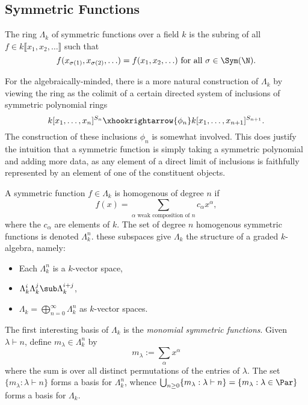 \documentclass[12pt]{article}
\begin{document}
\subsection{Symmetric Functions}

\begin{definition}\label{def:symfunc}
    The ring $ \Lambda_{k} $ of symmetric functions over a field $ k $ is the subring of all $ f\in k\llbracket x_{1}, x_{2}, \ldots\rrbracket $ such that
    \[
      f(x_{\sigma(1)}, x_{\sigma(2)},\ldots) = f(x_{1},x_{2},\ldots) \text{ for all } \sigma\in \Sym(\N).
    \]
\end{definition}
\begin{remark}
    For the algebraically-minded, there is a more natural construction of $ \Lambda_{k} $ by viewing the ring as the colimit of a certain directed system of inclusions of symmetric polynomial rings
    \[
      k[x_{1},\ldots,x_{n}]^{S_{n}} \xhookrightarrow{\phi_{n}} k[x_{1},\ldots,x_{n+1}]^{S_{n+1}}.
    \]
    The construction of these inclusions $ \phi_{n} $ is somewhat involved. This does justify the intuition that a symmetric function is simply taking a symmetric polynomial and adding more data, as any element of a direct limit of inclusions is faithfully represented by an element of one of the constituent objects.

\end{remark}
\begin{definition}
    A symmetric function $ f\in \Lambda_{k} $ is homogenous of degree $ n $ if 
    \[
      f(x) = \sum_{\alpha\text{ weak composition of }n}c_{\alpha} x^{\alpha},
    \]
    where the $ c_{\alpha} $ are elements of $ k $. The set of degree $ n $ homogenous symmetric functions is denoted $ \Lambda_{k}^{n} $. these subspaces give $ \Lambda_{k} $ the structure of a graded $ k $-algebra, namely:
\end{definition}

\begin{itemize}
  \item Each $ \Lambda_{k}^{n} $ is a $ k $-vector space,
  \item $ \Lambda_{k}^{i} \Lambda_{k}^{j}\sub \Lambda_{k}^{i+j} $,
  \item $ \Lambda_{k}=\bigoplus_{n=0}^{\infty} \Lambda_{k}^{n} $ as $ k $-vector spaces.
\end{itemize}
The first interesting basis of $ \Lambda_{k} $ is the \textit{monomial symmetric functions}. Given $ \lambda\vdash n $, define $ m_{\lambda}\in \Lambda_{k}^{n} $ by 
\[
  m_{\lambda}:= \sum_{\alpha} x^{\alpha}
\]
where the sum is over all distinct permutations of the entries of $ \lambda $. The set $ \{m_{\lambda}: \lambda\vdash n\} $ forms a basis for $ \Lambda_{k}^{n} $, whence $\bigcup_{n\geq0} \{m_{\lambda}: \lambda\vdash n\} = \{m_{\lambda}: \lambda\in\Par\} $ forms a basis for $ \Lambda_{k} $.
\end{document}
